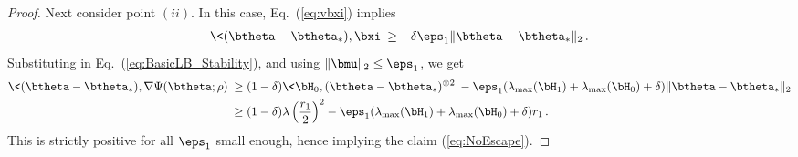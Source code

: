 \documentclass[11pt]{article}
\begin{document}
\begin{proof}
Next consider point $(ii)$. In this case, Eq.~(\ref{eq:vbxi}) implies
%
\begin{align}
%
\<(\btheta-\btheta_*),\bxi\>\ge -\delta\eps_1\|\btheta-\btheta_*\|_2\, .
%
\end{align}
%
Substituting in Eq.~(\ref{eq:BasicLB_Stability}), and using $\|\bmu\|_2\le \eps_1$, we get 
%
\begin{align}
%
\<(\btheta-\btheta_*),\nabla\Psi(\btheta;\rho)\>&\ge (1-\delta)\<\bH_0,(\btheta-\btheta_*)^{\otimes 2}\>-
\eps_1(\lambda_{\max}(\bH_1)+\lambda_{\max}(\bH_0)+\delta)\|\btheta-\btheta_*\|_2\nonumber \\
&\ge (1-\delta)\lambda  \left(\frac{r_1}{2}\right)^2-\eps_1(\lambda_{\max}(\bH_1)+\lambda_{\max}(\bH_0)+\delta)r_1\, .
%
\end{align}
%
This is strictly positive for all $\eps_1$ small enough, hence implying the claim (\ref{eq:NoEscape}).
\end{proof}
\end{document}
